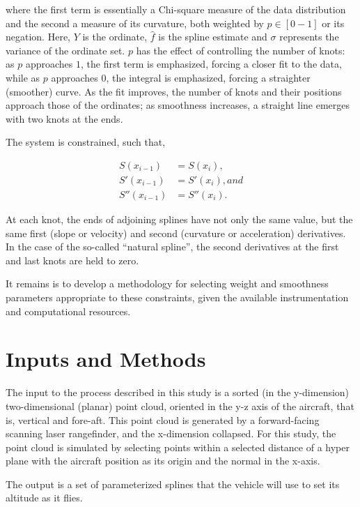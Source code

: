 \documentclass[doc]{apa6}
\begin{document}
where the first term is essentially a Chi-square measure of the data distribution and the second a measure of its curvature, both weighted by $p \in{[0-1]}$ or its negation. Here, $Y$ is the ordinate, $\hat{f}$ is the spline estimate and $\sigma$ represents the variance of the ordinate set. $p$ has the effect of controlling the number of knots: as $p$ approaches $1$, the first term is emphasized, forcing a closer fit to the data, while as $p$ approaches $0$, the integral is emphasized, forcing a straighter (smoother) curve. As the fit improves, the number of knots and their positions approach those of the ordinates; as smoothness increases, a straight line emerges with two knots at the ends.

The system is constrained, such that,

\begin{equation}
\begin{split}
S(x_{i-1}) &= S(x_i), \\
S'(x_{i-1}) &= S'(x_i), and \\ 
S''(x_{i-1}) &= S''(x_i).
\end{split}
\end{equation}

At each knot, the ends of adjoining splines have not only the same value, but the same first (slope or velocity) and second (curvature or acceleration) derivatives. In the case of the so-called ``natural spline'', the second derivatives at the first and last knots are held to zero. 

It remains is to develop a methodology for selecting weight and smoothness parameters appropriate to these constraints, given the available instrumentation and computational resources.


\section{Inputs and Methods}

The input to the process described in this study is a sorted (in the y-dimension) two-dimensional (planar) point cloud, oriented in the y-z axis of the aircraft, that is, vertical and fore-aft. This point cloud is generated by a forward-facing scanning laser rangefinder, and the x-dimension collapsed. For this study, the point cloud is simulated by selecting points within a selected distance of a hyper plane with the aircraft position as its origin and the normal in the x-axis. 

The output is a set of parameterized splines that the vehicle will use to set its altitude as it flies.
\end{document}
